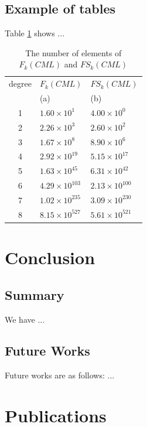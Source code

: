 \documentclass[12pt,epsf]{report}
\begin{document}
{{{{ \section{Example of tables}

 Table \ref{tab:num_of_schemata_satisfied_srp} shows ...
 
 \begin{table}[tb]
\begin{center}
\caption{The number of elements of $F_{k}(CML)$ and $FS_{k}(CML)$}
\label{tab:num_of_schemata_satisfied_srp}
 \begin{tabular}{c l l}
  \hline
 degree & $F_{k}(CML)$ &$FS_{k}(CML)$ \\
    & (a)&  (b)\\ 
  \hline
  \hline
  1 &  $1.60 \times 10^{1}$ & $4.00 \times 10^{0}$\\
  2 & $2.26 \times 10^{3}$ & $2.60 \times 10^{2}$  \\
  3 & $1.67 \times 10^{8}$ & $8.90 \times 10^{6}$\\
  4 & $2.92 \times 10^{19}$ & $5.15 \times 10^{17}$\\
  5 & $1.63 \times 10^{45}$ & $6.31 \times 10^{42}$\\
  6 & $4.29 \times 10^{103}$ & $2.13 \times 10^{100}$\\
  7 & $1.02 \times 10^{235}$ & $3.09 \times 10^{230}$\\
  8 & $8.15 \times 10^{527}$ & $5.61 \times 10^{521}$\\ 
  \hline
 \end{tabular}
\end{center}
\end{table}


\chapter{Conclusion}
\section{Summary}

We have ...

\section{Future Works}

Future works are as follows: ...

\newpage

\chapter*{Publications}

}}}}
\end{document}
